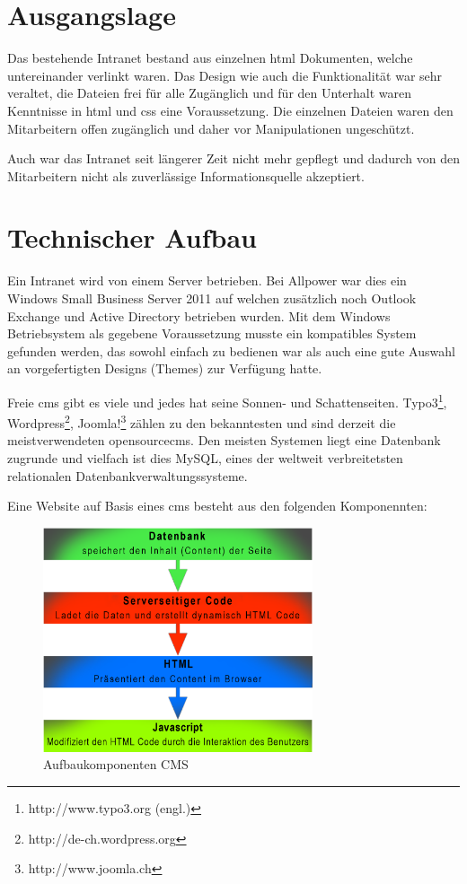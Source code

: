 \documentclass[a4paper,11pt,twoside,titlepage,openright]{report}
\numberwithin{equation}{section}		%
\numberwithin{figure}{section}			%
\numberwithin{table}{section}				%
\begin{document}
\section{Ausgangslage}
Das bestehende Intranet bestand aus einzelnen \acrshort{html} Dokumenten, welche untereinander verlinkt waren. Das Design wie auch die Funktionalität war sehr veraltet, die Dateien frei für alle Zugänglich und für den Unterhalt waren Kenntnisse in \acrshort{html} und \acrshort{css} eine Voraussetzung. Die einzelnen Dateien waren den Mitarbeitern offen zugänglich und daher vor Manipulationen ungeschützt.

Auch war das Intranet seit längerer Zeit nicht mehr gepflegt und dadurch von den Mitarbeitern nicht als zuverlässige Informationsquelle akzeptiert.

\section{Technischer Aufbau}
Ein Intranet wird von einem Server betrieben. Bei Allpower war dies ein Windows Small Business Server 2011 auf welchen zusätzlich noch Outlook Exchange und Active Directory betrieben wurden. Mit dem Windows Betriebsystem als gegebene Voraussetzung musste ein kompatibles System gefunden werden, das sowohl einfach zu bedienen war als auch eine gute Auswahl an vorgefertigten Designs (Themes) zur Verfügung hatte.

Freie \gls{cms} gibt es viele und jedes hat seine Sonnen- und Schattenseiten. Typo3\footnote{http://www.typo3.org (engl.)}, Wordpress\footnote{http://de-ch.wordpress.org}, Joomla!\footnote{http://www.joomla.ch} zählen zu den bekanntesten und sind derzeit die meistverwendeten \gls{opensource}\textendash \acrshort{cms}. Den meisten Systemen liegt eine Datenbank zugrunde und vielfach ist dies MySQL, eines der weltweit verbreitetsten relationalen Datenbankverwaltungssysteme.

Eine Website auf Basis eines \gls{cms} besteht aus den folgenden Komponennten:

\begin{figure}[H]
\centering
\includegraphics[width=300px]{Images/web-layers.png}
\caption{Aufbaukomponenten CMS}
\end{figure}
\newpage
\end{document}
